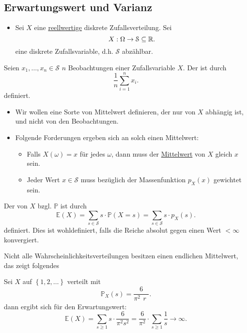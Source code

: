 \subsection{Erwartungswert und Varianz}
\begin{itemize}
    \item Sei $X$ eine  \underline{reellwertige} diskrete Zufallsverteilung. Sei 
        \[
        X : \Omega \to  \mathcal{S}\subseteq \mathbb{R}
        .\] 
        eine diskrete Zufallsvariable, d.h. $\mathcal{S}$ abzählbar.
\end{itemize}
\begin{definition}
    Seien $x_1,\ldots,x_n\in \mathcal{S}$ $n$ Beobachtungen einer Zufallsvariable $X$. Der  ist durch
    \[
    \frac{1}{n}\sum_{i=1}^n x_i
    .\] 
    definiert.
\end{definition}
\begin{itemize}
    \item Wir wollen eine Sorte von Mittelwert definieren, der nur von $X$ abhängig ist, und nicht von den Beobachtungen.
    \item Folgende Forderungen ergeben sich an solch einen Mittelwert:
        \begin{itemize}
            \item Falls $X(\omega) = x$ für jedes $\omega$, dann muss der \underline{Mittelwert} von $X$ gleich  $x$ sein. 
            \item Jeder Wert $x\in \mathcal{S}$ muss bezüglich der Massenfunktion $p_X(x)$ gewichtet sein.
        \end{itemize}
\end{itemize}
\begin{definition}
    Der  von $X$ bzgl.  $\mathbb{P}$ ist durch
    \[
        \mathbb{E}(X) = \sum_{s\in \mathcal{S}} s\cdot \mathbb{P}(X=s) = \sum_{s\in \mathcal{S}} s\cdot p_{X}(s)
    .\] 
    definiert. Dies ist wohldefiniert, falls die Reiche absolut gegen einen Wert $<\infty$ konvergiert.
\end{definition}
\begin{remark}
    Nicht alle Wahrscheinlichkeitsverteilungen besitzen einen endlichen Mittelwert, das zeigt folgendes
\end{remark}
\begin{example}
    Sei $X$ auf  $\left \{1,2,\ldots\right\} $ verteilt mit
    \[
        \mathbb{P}_X(s) = \frac{6}{\pi^2\substack{r} }
    .\] 
    dann ergibt sich für den Erwartungswert:
    \[
        \mathbb{E}(X) = \sum_{s\geq 1} s\cdot \frac{6}{\pi^2s^2} = \frac{6}{\pi^2} \cdot  \sum_{s\geq 1} \frac{1}{s}\to  \infty
    .\] 
\end{example}





